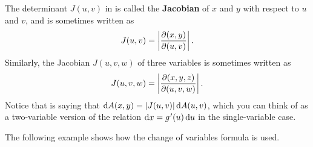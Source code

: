 
The determinant $J(u,v)$ in  is called the \textbf{Jacobian} of $x$ and $y$ with respect to $u$ and $v$, and is sometimes written as
\[J(u,v) = \left\lvert \frac{\partial (x,y)}{\partial (u,v)} \right\rvert .\]
Similarly, the Jacobian $J(u,v,w)$ of three variables is sometimes written as
\[J(u,v,w) = \left\lvert \frac{\partial (x,y,z)}{\partial (u,v,w)} \right\rvert .\]
Notice that  is saying that $\operatorname{d}\! A(x,y) = \left\lvert J(u,v) \right\rvert\operatorname{d}\! A(u,v)$, which you can think of as a two-variable version of the relation $\dd x = g\primeskip'(u)\dd u$ in the single-variable case.


The following example shows how the change of variables formula is used.

